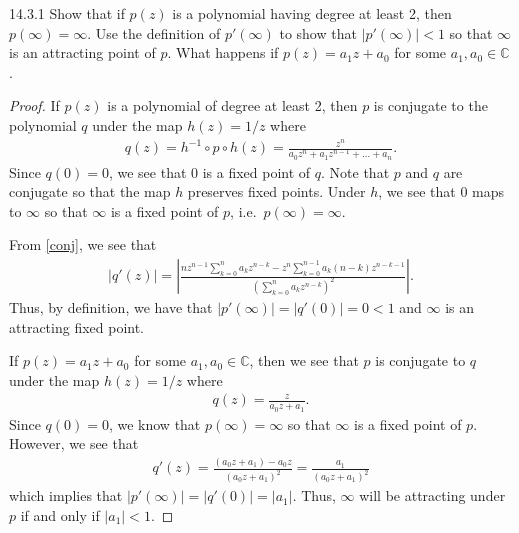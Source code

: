 \begin{problem}{14.3.1}
  Show that if $p(z)$ is a polynomial having degree at least 2, then $p(\infty) = \infty$.
  Use the definition of $p'(\infty)$ to show that $|p'(\infty)| < 1$ so that $\infty$
  is an attracting point of $p$. What happens if $p(z) = a_1z + a_0$ for some $a_1,a_0 \in \mathbb{C}$.
\end{problem}

\begin{proof}
  If $p(z)$ is a polynomial of degree at least 2, then $p$ is conjugate to the polynomial $q$
  under the map $h(z) = 1/z$ where
  \begin{align}\label{conj}
    q(z) = h^{-1} \circ p \circ h (z) = \frac{z^n}{a_0 z^n + a_1z^{n-1} + \dots + a_n}.
  \end{align}
  Since $q(0) = 0$, we see that $0$ is a fixed point of $q$. Note that $p$ and $q$
  are conjugate so that the map $h$ preserves fixed points. Under $h$, we see that $0$ maps to $\infty$
  so that $\infty$ is a fixed point of $p$, i.e.\ $p(\infty) = \infty$.

  From \eqref{conj}, we see that
  \begin{align*}
    |q'(z)| = \left|\frac{n z^{n-1} \sum_{k=0}^n a_k z^{n-k} - z^n \sum_{k=0}^{n-1} a_k(n-k) z^{n-k-1}  }{\left( \sum_{k=0}^n a_k z^{n-k} \right)^2}\right|.
  \end{align*}
  Thus, by definition, we have that $|p'(\infty)| = |q'(0)| = 0 < 1$ and $\infty$
  is an attracting fixed point.

  If $p(z) = a_1 z + a_0$ for some $a_1,a_0 \in \mathbb{C}$, then we see that $p$
  is conjugate to $q$ under the map $h(z) = 1/z$ where
  \begin{align*}
    q(z) = \frac{z}{a_0z + a_1}.
  \end{align*}
  Since $q(0)=0$, we know that $p(\infty) = \infty$ so that $\infty$ is a fixed point of $p$.
  However, we see that
  \begin{align*}
    q'(z) = \frac{(a_0z + a_1) - a_0z}{(a_0z + a_1)^2} = \frac{a_1}{(a_0z + a_1)^2}
  \end{align*}
  which implies that $|p'(\infty)| = |q'(0)| = |a_1|$.
  Thus, $\infty$ will be attracting under $p$ if and only if $|a_1| < 1$.
\end{proof}
\newpage
